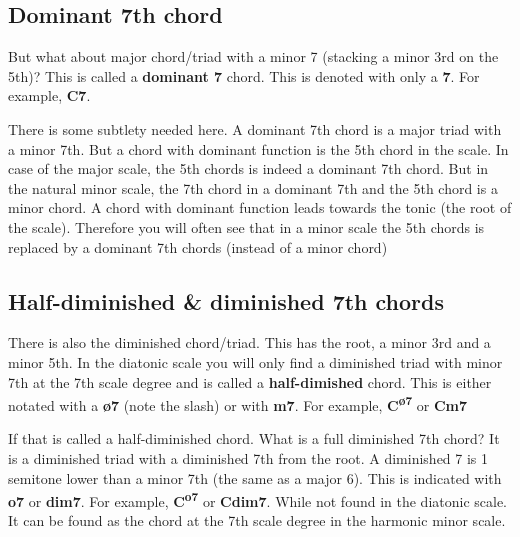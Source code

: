 \subsection{Dominant 7th chord}

But what about major chord/triad with a minor 7 (stacking a minor 3rd on the 5th)? This is called a \textbf{dominant 7} chord. This is denoted with only a \textbf{7}. For example, \textbf{C7}.

There is some subtlety needed here. A dominant 7th chord is a major triad with a minor 7th. But a chord with dominant function is the 5th chord in the scale. In case of the major scale, the 5th chords is indeed a dominant 7th chord. But in the natural minor scale, the 7th chord in a dominant 7th and the 5th chord is a minor chord. A chord with dominant function leads towards the tonic (the root of the scale). Therefore you will often see that in a minor scale the 5th chords is replaced by a dominant 7th chords (instead of a minor chord) 


\subsection{Half-diminished \& diminished 7th chords}

There is also the diminished chord/triad. This has the root, a minor 3rd and a minor 5th. In the diatonic scale you will only find a diminished triad with minor 7th at the 7th scale degree and is called a \textbf{half-dimished} chord. This is either notated with a \textbf{\o7} (note the slash) or with \textbf{m7}. For example, \textbf{C\textsuperscript{\o7}} or \textbf{Cm7}

If that is called a half-diminished chord. What is a full diminished 7th chord? It is a diminished triad with a diminished 7th from the root. A diminished 7 is 1 semitone lower than a minor 7th (the same as a major 6). This is indicated with \textbf{o7} or \textbf{dim7}. For example, \textbf{C\textsuperscript{o7}} or \textbf{Cdim7}. While not found in the diatonic scale. It can be found as the chord at the 7th scale degree in the harmonic minor scale.

